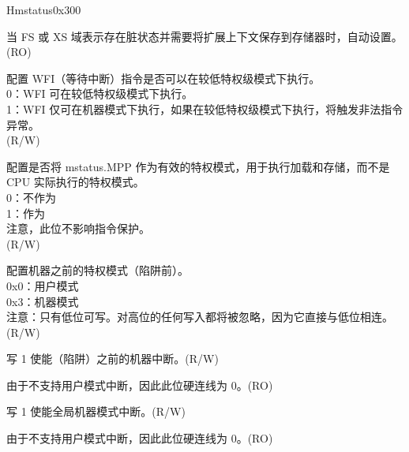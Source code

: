 \begin{register}{H}{mstatus}{0x300}\label{regdesc:MSTATUS}
%
%
%
%
%
%
%
%
%
%
%
%
%
%
%
\regnewline%
\begin{regdesc}\begin{reglist}
\label{fielddesc:MSTATUS_SD}\item [SD] 当 FS 或 XS 域表示存在脏状态并需要将扩展上下文保存到存储器时，自动设置。(RO)
\label{fielddesc:MSTATUSTW}\item [TW] 配置 WFI（等待中断）指令是否可以在较低特权级模式下执行。\\
0：WFI 可在较低特权级模式下执行。\\
1：WFI 仅可在机器模式下执行，如果在较低特权级模式下执行，将触发非法指令异常。\\
(R/W)
\label{fielddesc:MSTATUS_MPRV}\item [MPRV] 配置是否将 mstatus.MPP 作为有效的特权模式，用于执行加载和存储，而不是 CPU 实际执行的特权模式。\\
0：不作为\\
1：作为\\
注意，此位不影响指令保护。\\
(R/W) \\
\label{fielddesc:MSTATUSMPP}\item [MPP] 配置机器之前的特权模式（陷阱前）。\\
0x0：用户模式\\
0x3：机器模式\\
注意：只有低位可写。对高位的任何写入都将被忽略，因为它直接与低位相连。\\
(R/W)
\label{fielddesc:MSTATUSMPIE}\item [MPIE] 写 1 使能（陷阱）之前的机器中断。(R/W)
\label{fielddesc:MSTATUSUPIE}\item [UPIE] 由于不支持用户模式中断，因此此位硬连线为 0。(RO)


\label{fielddesc:MSTATUSMIE}\item [MIE] 写 1 使能全局机器模式中断。(R/W)
\label{fielddesc:MSTATUSUIE}\item [UIE] 由于不支持用户模式中断，因此此位硬连线为 0。(RO)
\end{reglist}\end{regdesc}
\end{register}

